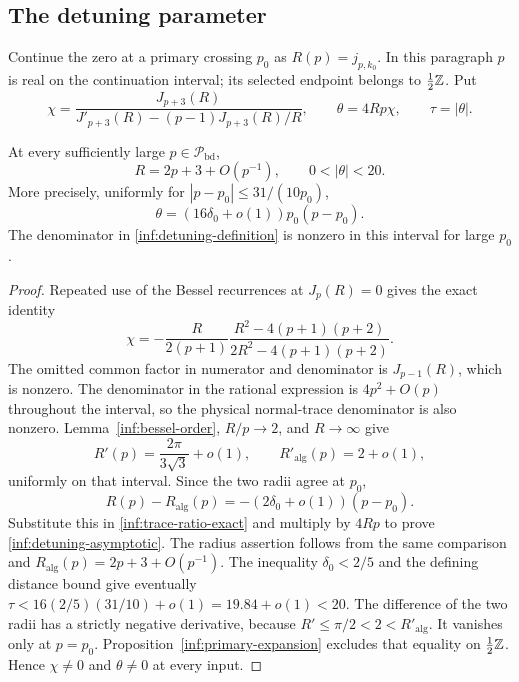 \subsection{The detuning parameter}

Continue the zero at a primary crossing $p_0$ as $R(p)=j_{p,k_0}$.
In this paragraph $p$ is real on the continuation interval; its
selected endpoint belongs to $\tfrac12\mathbb{Z}$. Put
\begin{equation}\label{inf:detuning-definition}
 \chi=\frac{J_{p+3}(R)}{J'_{p+3}(R)-(p-1)J_{p+3}(R)/R},
 \qquad \theta=4Rp\chi,\qquad \tau=|\theta|.
\end{equation}

\begin{lemma}\label{inf:detuning}
At every sufficiently large $p\in\mathcal P_{\mathrm{bd}}$,
\begin{equation}\label{inf:detuning-range}
 R=2p+3+O(p^{-1}),\qquad 0<|\theta|<20.
\end{equation}
More precisely, uniformly for $|p-p_0|\le31/(10p_0)$,
\begin{equation}\label{inf:detuning-asymptotic}
 \theta=(16\delta_0+o(1))p_0(p-p_0).
\end{equation}
The denominator in \eqref{inf:detuning-definition} is nonzero in this
interval for large $p_0$.
\end{lemma}
\begin{proof}
Repeated use of the Bessel recurrences at $J_p(R)=0$ gives the exact
identity
\begin{equation}\label{inf:trace-ratio-exact}
 \chi=-\frac R{2(p+1)}\frac{R^2-4(p+1)(p+2)}{2R^2-4(p+1)(p+2)}.
\end{equation}
The omitted common factor in numerator and denominator is
$J_{p-1}(R)$, which is nonzero. The denominator in the rational
expression is $4p^2+O(p)$ throughout the interval, so the physical
normal-trace denominator is also nonzero.
Lemma~\ref{inf:bessel-order}, $R/p\to2$, and $R\to\infty$ give
\[
 R'(p)=\frac{2\pi}{3\sqrt3}+o(1),\qquad
 R'_{\mathrm{alg}}(p)=2+o(1),
\]
uniformly on that interval. Since the two radii agree at $p_0$,
\[
 R(p)-R_{\mathrm{alg}}(p)=-(2\delta_0+o(1))(p-p_0).
\]
Substitute this in \eqref{inf:trace-ratio-exact} and multiply by
$4Rp$ to prove \eqref{inf:detuning-asymptotic}.
The radius assertion follows from the same comparison and
$R_{\mathrm{alg}}(p)=2p+3+O(p^{-1})$.
The inequality $\delta_0<2/5$ and the defining distance bound
give eventually
$\tau<16(2/5)(31/10)+o(1)=19.84+o(1)<20$.
The difference of the two radii has a strictly negative derivative,
because $R'\le\pi/2<2<R'_{\mathrm{alg}}$. It vanishes only at
$p=p_0$. Proposition~\ref{inf:primary-expansion} excludes that equality
on $\tfrac12\mathbb{Z}$. Hence $\chi\ne0$ and $\theta\ne0$ at every input.
\end{proof}

